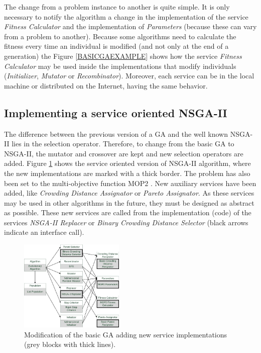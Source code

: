  The change from a problem instance to another is quite simple. It is only necessary to notify the algorithm a change in the implementation of the service {\em Fitness Calculator} and the implementation of {\em Parameters} (because these can vary from a problem to another). Because some algorithms need to calculate the fitness every time an individual is modified (and not only at the end of a generation) the Figure \ref{BASICGAEXAMPLE} shows how the service {\em Fitness Calculator} may be used inside the implementations that modify individuals ({\em Initializer}, {\em Mutator} or {\em Recombinator}). Moreover, each service can be in the local machine or distributed on the Internet, having the same behavior.

\subsection{Implementing a service oriented NSGA-II}
\label{sec:nsga2}

The difference between the previous version of a GA and the well known NSGA-II \citep{NSGA2} lies in the selection operator. Therefore, to change from the basic GA to NSGA-II, the mutator and crossover are kept and new selection operators are added. Figure \ref{fig:nsga2} shows the service oriented version of NSGA-II algorithm, where the new implementations are marked with a thick border. The problem has also been set to the multi-objective function MOP2 \citep{MULTIOBJ}. New auxiliary services have been added, like {\em Crowding Distance Assignator} or {\em Pareto Assignator}. As these services may be used in other algorithms in the future, they must be designed as abstract as possible. These new services are called from the implementation (code) of the services {\em NSGA-II Replacer} or {\em Binary Crowding Distance Selector} (black arrows indicate an interface call). 




\begin{figure}
\centering
\includegraphics[width=5cm]{gfx/soaea/nsga2.jpg}
\caption{Modification of the basic GA adding new service implementations (grey blocks with thick lines).}
\label{fig:nsga2}
\end{figure}



